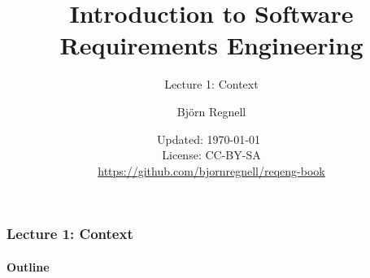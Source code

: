 \documentclass{reqenglecture}
\title{Introduction to Software Requirements Engineering}
\subtitle{Lecture 1: Context}
\author{Björn Regnell}
\date{\vspace{1em}\footnotesize Updated: \today~
\\ License: CC-BY-SA 
\\ \url{https://github.com/bjornregnell/reqeng-book} 
}
\begin{document}
\maketitle

\begin{frame}
\frametitle{Lecture 1: Context}
\framesubtitle{Outline}
\tableofcontents
\end{frame}







\end{document}
